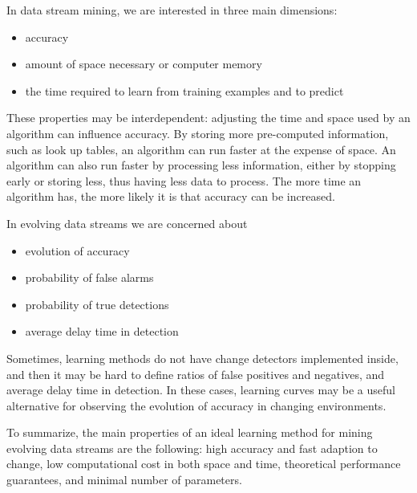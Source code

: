 %

In data stream mining, we are interested in three main dimensions:
\begin{itemize}
 \item accuracy 
 \item amount of space necessary or computer memory
 \item the time required to learn from training examples and to predict
\end{itemize}

These properties may be interdependent: adjusting the time and space used 
by an algorithm can influence accuracy. By storing more pre-computed information, 
such as look up tables, an algorithm can run faster at the expense of
space. An algorithm can also run faster by processing less information, either
by stopping early or storing less, thus having less data to process. The more
time an algorithm has, the more likely it is that accuracy can be
increased.

In evolving data streams we are concerned about 

\begin{itemize}
 \item evolution of accuracy
 \item probability of false alarms
 \item probability of true detections
 \item average delay time in detection
\end{itemize}

Sometimes, learning methods do not have change detectors implemented inside,
and then it may be hard to define ratios of false positives and negatives, and
average delay time in detection. In these cases, learning curves may be a useful 
alternative for observing the evolution of accuracy in changing environments.

To summarize, the main properties of an ideal learning method for mining evolving data streams 
are the following:
high accuracy and fast adaption to change,
low computational cost in both space and time,
theoretical performance guarantees, 
and minimal number of parameters. 


